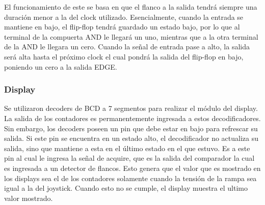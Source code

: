 El funcionamiento de este se basa en que el flanco a la salida tendrá siempre una duración menor a la del clock utilizado. Esencialmente, cuando la entrada se mantiene en bajo, el flip-flop tendrá guardado un estado bajo, por lo que al terminal de la compuerta AND le llegará un uno, mientras que a la otra terminal de la AND le llegara un cero. Cuando la señal de entrada pase a alto, la salida será alta hasta el próximo clock el cual pondrá la salida del flip-flop en bajo, poniendo un cero a la salida EDGE.

\subsubsection{Display}

Se utilizaron decoders de BCD a 7 segmentos para realizar el módulo del display. La salida de los contadores es permanentemente ingresada a estos decodificadores. Sin embargo, los decoders poseen un pin que debe estar en bajo para refrescar su salida. Si este pin se encuentra en un estado alto, el decodificador no actualiza su salida, sino que mantiene a esta en el último estado en el que estuvo. Es a este pin al cual le ingresa la señal de acquire, que es la salida del comparador la cual es ingresada a un detector de flancos. Esto genera que el valor que es mostrado en los displays sea el de los contadores solamente cuando la tensión de la rampa sea igual a la del joystick. Cuando esto no se cumple, el display muestra el ultimo valor mostrado.

